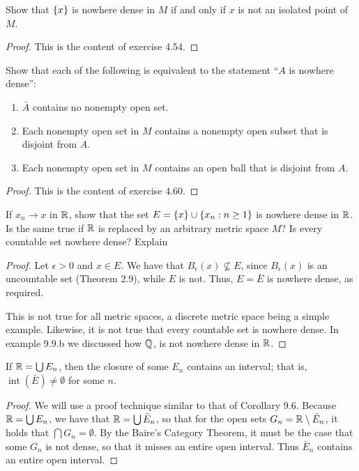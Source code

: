 \begin{exercise}{16}
Show that $\{x\}$ is nowhere dense in $M$ if and only if $x$ is not an isolated point of $M$.
\end{exercise}
\begin{proof}
This is the content of exercise 4.54.
\end{proof} 

\begin{exercise}{19}
Show that each of the following is equivalent to the statement ``$A$ is nowhere dense'':
\begin{enumerate}
    \item $\bar{A}$ contains no nonempty open set.
    \item Each nonempty open set in $M$ contains a nonempty open subset that is disjoint from $A$.
    \item Each nonempty open set in $M$ contains an open ball that is disjoint from $A$.
\end{enumerate}
\end{exercise}
\begin{proof}
This is the content of exercise 4.60.
\end{proof} 

\begin{exercise}{21}
If $x_n \to x$ in $\mathbb{R}$, show that the set $E = \{x\} \cup \{x_n: n \geq 1\}$ is nowhere dense in $\mathbb{R}$.
Is the same true if $\mathbb{R}$ is replaced by an arbitrary metric space $M$?
Is every countable set nowhere dense?
Explain
\end{exercise}
\begin{proof}
Let $\epsilon >0$ and $x \in E$.
We have that $B_\epsilon(x) \not\subseteq E$, since $B_\epsilon(x)$ is an uncountable set (Theorem 2.9), while $E$ is not.
Thus, $E = \bar{E}$ is nowhere dense, as required.

This is not true for all metric spaces, a discrete metric space being a simple example.
Likewise, it is not true that every countable set is nowhere dense.
In example 9.9.b we discussed how $\mathbb{Q}$, is not nowhere dense in $\mathbb{R}$.
\end{proof} 

\begin{exercise}{24}
If $\mathbb{R} = \bigcup E_n$, then the closure of some $E_n$ contains an interval;
that is, $\operatorname{int}(\bar{E}) \neq \emptyset$ for some $n$.
\end{exercise}
\begin{proof}
We will use a proof technique similar to that of Corollary 9.6.
Because $\mathbb{R} = \bigcup E_n$, we have that $\mathbb{R} = \bigcup \bar{E}_n$, so that for the open sets $G_n = \mathbb{R} \setminus \bar{E}_n$, it holds that $\bigcap G_n = \emptyset$.
By the Baire's Category Theorem, it must be the case that some $G_n$ is not dense, so that it misses an entire open interval. 
Thus $\bar{E}_n$ contains an entire open interval.
\end{proof} 

